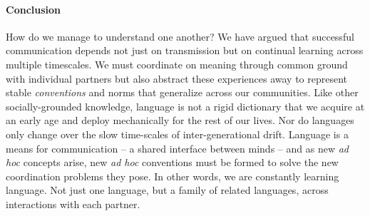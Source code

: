 %
%


\paragraph{Conclusion}

How do we manage to understand one another?
We have argued that successful communication depends not just on transmission but on continual learning across multiple timescales. 
We must coordinate on meaning through common ground with individual partners but also abstract these experiences away to represent stable \emph{conventions} and norms that generalize across our communities.
Like other socially-grounded knowledge, language is not a rigid dictionary that we acquire at an early age and deploy mechanically for the rest of our lives. 
Nor do languages only change over the slow time-scales of inter-generational drift.
Language is a means for communication -- a shared interface between minds -- and as new \emph{ad hoc} concepts arise, new \emph{ad hoc} conventions must be formed to solve the new coordination problems they pose.
In other words, we are constantly learning language. 
Not just one language, but a family of related languages, across interactions with each partner. 

